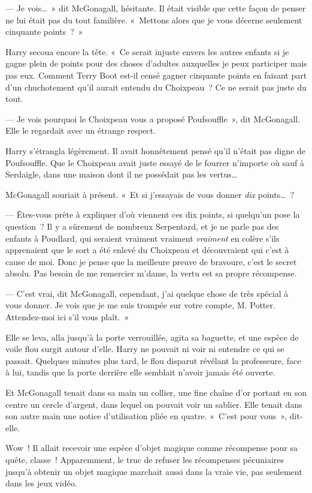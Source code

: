 --- Je vois…~» dit McGonagall, hésitante.
Il était visible que cette façon de penser ne lui était pas du tout familière.
«~Mettons alors que je vous décerne seulement cinquante points~?~»

Harry secoua encore la tête.
«~Ce serait injuste envers les autres enfants si je gagne plein de points pour des choses d'adultes auxquelles je peux participer mais pas eux.
Comment Terry Boot est-il censé gagner cinquante points en faisant part d'un chuchotement qu'il aurait entendu du Choixpeau~?
Ce ne serait pas juste du tout.

--- Je vois pourquoi le Choixpeau vous a proposé Poufsouffle~», dit McGonagall.
Elle le regardait avec un étrange respect.

Harry s'étrangla légèrement.
Il avait honnêtement pensé qu'il n'était pas digne de Poufsouffle.
Que le Choixpeau avait juste essayé de le fourrer n'importe où sauf à Serdaigle, dans une maison dont il ne possédait pas les vertus…

McGonagall souriait à présent.
«~Et si j'essayais de vous donner \emph{dix} points…~?

--- Êtes-vous prête à expliquer d'où viennent ces dix points, si quelqu'un pose la question~?
Il y a sûrement de nombreux Serpentard, et je ne parle pas des enfants à Poudlard, qui seraient vraiment vraiment \emph{vraiment} en colère s'ils apprenaient que le sort a été enlevé du Choixpeau et découvraient qui c'est à cause de moi.
Donc je pense que la meilleure preuve de bravoure, c'est le secret absolu.
Pas besoin de me remercier m'dame, la vertu est sa propre récompense.

--- C'est vrai, dit McGonagall, cependant, j'ai quelque chose de très spécial à vous donner.
Je vois que je me suis trompée sur votre compte, M. Potter.
Attendez-moi ici s'il vous plaît.~»

Elle se leva, alla jusqu'à la porte verrouillée, agita sa baguette, et une espèce de voile flou surgit autour d'elle.
Harry ne pouvait ni voir ni entendre ce qui se passait.
Quelques minutes plus tard, le flou disparut révélant la professeure, face à lui, tandis que la porte derrière elle semblait n'avoir jamais été ouverte.

Et McGonagall tenait dans sa main un collier, une fine chaîne d'or portant en son centre un cercle d'argent, dans lequel on pouvait voir un sablier.
Elle tenait dans son autre main une notice d'utilisation pliée en quatre.
«~C'est pour vous~», dit-elle.

Wow~! Il allait recevoir une espèce d'objet magique comme récompense pour sa quête, classe~!
Apparemment, le truc de refuser les récompenses pécuniaires jusqu'à obtenir un objet magique marchait aussi dans la vraie vie, pas seulement dans les jeux vidéo.

